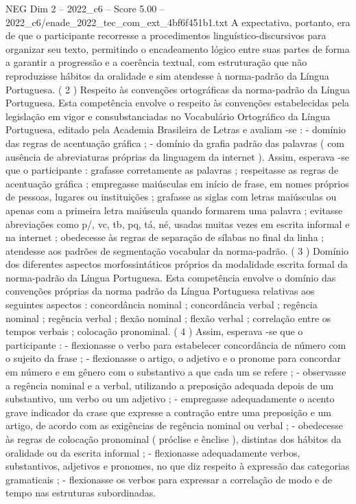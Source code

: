 \begin{textsample}{NEG Dim 2 – 2022\_c6 – Score 5.00 – 2022\_c6/enade\_2022\_tec\_com\_ext\_4bf6f451b1.txt}
A expectativa, portanto, era de que o participante recorresse a procedimentos linguístico-discursivos para organizar seu texto, permitindo o encadeamento lógico entre suas partes de forma a garantir a progressão e a coerência textual, com estruturação que não reproduzisse hábitos da oralidade e sim atendesse à norma-padrão da Língua Portuguesa. ( 2 ) Respeito às convenções ortográficas da norma-padrão da Língua Portuguesa.
Esta competência envolve o respeito às convenções estabelecidas pela legislação em vigor e consubstanciadas no Vocabulário Ortográfico da Língua Portuguesa, editado pela Academia Brasileira de Letras e avaliam -se : - domínio das regras de acentuação gráfica ; - domínio da grafia padrão das palavras ( com ausência de abreviaturas próprias da linguagem da internet ).
Assim, esperava -se que o participante : grafasse corretamente as palavras ; respeitasse as regras de acentuação gráfica ; empregasse maiúsculas em início de frase, em nomes próprios de pessoas, lugares ou instituições ; grafasse as siglas com letras maiúsculas ou apenas com a primeira letra maiúscula quando formarem uma palavra ; evitasse abreviações como p/, vc, tb, pq, tá, né, usadas muitas vezes em escrita informal e na internet ; obedecesse às regras de separação de sílabas no final da linha ; atendesse aos padrões de segmentação vocabular da norma-padrão. ( 3 ) Domínio dos diferentes aspectos morfossintáticos próprios da modalidade escrita formal da norma-padrão da Língua Portuguesa.
Esta competência envolve o domínio das convenções próprias da norma padrão da Língua Portuguesa relativas aos seguintes aspectos : concordância nominal ; concordância verbal ; regência nominal ; regência verbal ; flexão nominal ; flexão verbal ; correlação entre os tempos verbais ; colocação pronominal. ( 4 ) Assim, esperava -se que o participante : - flexionasse o verbo para estabelecer concordância de número com o sujeito da frase ; - flexionasse o artigo, o adjetivo e o pronome para concordar em número e em gênero com o substantivo a que cada um se refere ; - observasse a regência nominal e a verbal, utilizando a preposição adequada depois de um substantivo, um verbo ou um adjetivo ; - empregasse adequadamente o acento grave indicador da crase que expresse a contração entre uma preposição e um artigo, de acordo com as exigências de regência nominal ou verbal ; - obedecesse às regras de colocação pronominal ( próclise e ênclise ), distintas dos hábitos da oralidade ou da escrita informal ; - flexionasse adequadamente verbos, substantivos, adjetivos e pronomes, no que diz respeito à expressão das categorias gramaticais ; - flexionasse os verbos para expressar a correlação de modo e de tempo nas estruturas subordinadas.

\end{textsample}
